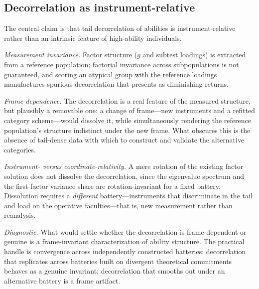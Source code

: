 \documentclass{article}
\begin{document}
\subsection{Decorrelation as instrument-relative}\label{app:singularity}
The central claim is that tail decorrelation of abilities is instrument-relative rather than an intrinsic feature of high-ability individuals.

\emph{Measurement invariance.} Factor structure ($g$ and subtest loadings) is extracted from a reference population; factorial invariance \cite{meredith1993} across subpopulations is not guaranteed, and scoring an atypical group with the reference loadings manufactures spurious decorrelation that presents as diminishing returns.

\emph{Frame-dependence.} The decorrelation is a real feature of the measured structure, but plausibly a removable one: a change of frame---new instruments and a refitted category scheme---would dissolve it, while simultaneously rendering the reference population's structure indistinct under the new frame. What obscures this is the absence of tail-dense data with which to construct and validate the alternative categories.

\emph{Instrument- versus coordinate-relativity.} A mere rotation of the existing factor solution does not dissolve the decorrelation, since the eigenvalue spectrum and the first-factor variance share are rotation-invariant for a fixed battery. Dissolution requires a \emph{different} battery---instruments that discriminate in the tail and load on the operative faculties---that is, new measurement rather than reanalysis.

\emph{Diagnostic.} What would settle whether the decorrelation is frame-dependent or genuine is a frame-invariant characterization of ability structure. The practical handle is convergence across independently constructed batteries: decorrelation that replicates across batteries built on divergent theoretical commitments behaves as a genuine invariant; decorrelation that smooths out under an alternative battery is a frame artifact.
\end{document}
